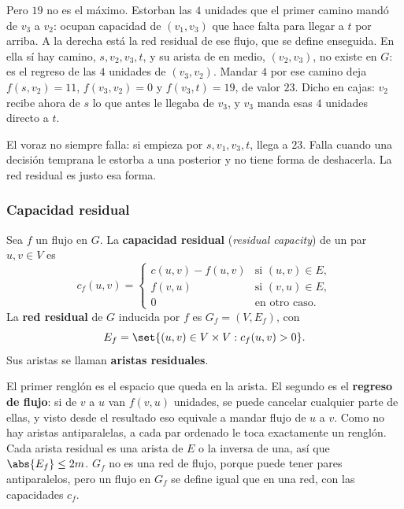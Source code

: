 \documentclass[11pt,letterpaper]{article}
\begin{document}
\begin{ejemplo}
\begin{center}
  \end{center}
  Pero $19$ no es el máximo. Estorban las $4$ unidades que el primer
  camino mandó de $v_3$ a $v_2$: ocupan capacidad de $(v_1, v_3)$ que
  hace falta para llegar a $t$ por arriba. A la derecha está la red
  residual de ese flujo, que se define enseguida. En ella sí hay
  camino, $s, v_2, v_3, t$, y su arista de en medio, $(v_2, v_3)$, no
  existe en $G$: es el regreso de las $4$ unidades de $(v_3, v_2)$.
  Mandar $4$ por ese camino deja $f(s, v_2) = 11$, $f(v_3, v_2) = 0$ y
  $f(v_3, t) = 19$, de valor $23$. Dicho en cajas: $v_2$ recibe ahora
  de $s$ lo que antes le llegaba de $v_3$, y $v_3$ manda esas $4$
  unidades directo a $t$.
\end{ejemplo}

El voraz no siempre falla: si empieza por $s, v_1, v_3, t$, llega a
$23$. Falla cuando una decisión temprana le estorba a una posterior y
no tiene forma de deshacerla. La red residual es justo esa forma.

\subsubsection*{Capacidad residual}

\begin{definicion}\label{def:red-residual}
  Sea $f$ un flujo en $G$. La \textbf{capacidad residual}
  (\textit{residual capacity}) de un par $u, v \in V$ es
  \[
    c_f(u, v) =
    \begin{cases}
      c(u, v) - f(u, v) & \text{si } (u, v) \in E , \\
      f(v, u)           & \text{si } (v, u) \in E , \\
      0                 & \text{en otro caso.}
    \end{cases}
  \]
  La \textbf{red residual} de $G$ inducida por $f$ es
  $G_f = (V, E_f)$, con
  \[
    E_f = \set{(u, v) \in V \times V : c_f(u, v) > 0} .
  \]
  Sus aristas se llaman \textbf{aristas residuales}.
\end{definicion}

El primer renglón es el espacio que queda en la arista. El segundo es
el \textbf{regreso de flujo}: si de $v$ a $u$ van $f(v, u)$ unidades,
se puede cancelar cualquier parte de ellas, y visto desde el resultado
eso equivale a mandar flujo de $u$ a $v$. Como no hay aristas
antiparalelas, a cada par ordenado le toca exactamente un renglón.
Cada arista residual es una arista de $E$ o la inversa de una, así que
$\abs{E_f} \le 2m$. $G_f$ no es una red de flujo, porque puede tener
pares antiparalelos, pero un flujo en $G_f$ se define igual que en una
red, con las capacidades $c_f$.
\end{document}
